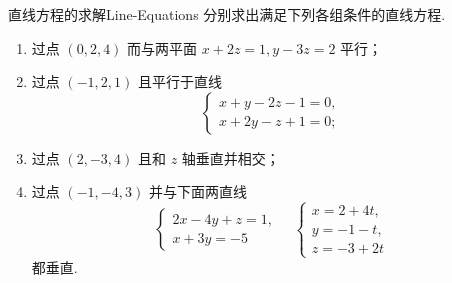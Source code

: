 \begin{problem}{直线方程的求解}{Line-Equations}
    分别求出满足下列各组条件的直线方程.
    \begin{enumerate}
        \item 过点 $(0, 2, 4)$ 而与两平面 $x + 2z = 1, y - 3z = 2$ 平行；
        \item 过点 $(-1, 2, 1)$ 且平行于直线
              \begin{equation}
                  \begin{cases}
                      x + y - 2z - 1 = 0, \\
                      x + 2y - z + 1 = 0;
                  \end{cases}
              \end{equation}
        \item 过点 $(2, -3, 4)$ 且和 $z$ 轴垂直并相交；
        \item 过点 $(-1, -4, 3)$ 并与下面两直线
              \begin{equation}
                  \begin{cases}
                      2x - 4y + z = 1, \\
                      x + 3y = -5
                  \end{cases} \quad
                  \begin{cases}
                      x = 2 + 4t, \\
                      y = -1 - t, \\
                      z = -3 + 2t
                  \end{cases}
              \end{equation}
              都垂直.
    \end{enumerate}
\end{problem}

